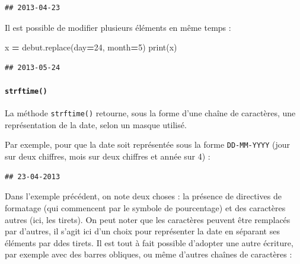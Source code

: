 \documentclass[12pt,]{book}
\newenvironment{Shaded}{\begin{snugshade}}{\end{snugshade}}
\newcommand{\DecValTok}[1]{\textcolor[rgb]{0.00,0.00,0.81}{#1}}
\newcommand{\SpecialCharTok}[1]{\textcolor[rgb]{0.00,0.00,0.00}{#1}}
\newcommand{\StringTok}[1]{\textcolor[rgb]{0.31,0.60,0.02}{#1}}
\newcommand{\OperatorTok}[1]{\textcolor[rgb]{0.81,0.36,0.00}{\textbf{#1}}}
\newcommand{\BuiltInTok}[1]{#1}
\newcommand{\NormalTok}[1]{#1}
\let\oldparagraph\paragraph
\renewcommand{\paragraph}[1]{\oldparagraph{#1}\mbox{}}
\numberwithin{equation}{section}
\numberwithin{countremarque}{section}
\begin{document}
\begin{lstlisting}
## 2013-04-23
\end{lstlisting}

Il est possible de modifier plusieurs éléments en même temps :

\begin{Shaded}
\begin{Highlighting}[]
\NormalTok{x }\OperatorTok{=}\NormalTok{ debut.replace(day}\OperatorTok{=}\DecValTok{24}\NormalTok{, month}\OperatorTok{=}\DecValTok{5}\NormalTok{)}
\BuiltInTok{print}\NormalTok{(x)}
\end{Highlighting}
\end{Shaded}

\begin{lstlisting}
## 2013-05-24
\end{lstlisting}

\paragraph{\texorpdfstring{\texttt{strftime()}}{strftime()}}\label{strftime}

La méthode \texttt{strftime()} retourne, sous la forme d'une chaîne de
caractères, une représentation de la date, selon un masque utilisé.

Par exemple, pour que la date soit représentée sous la forme
\texttt{DD-MM-YYYY} (jour sur deux chiffres, mois sur deux chiffres et
année sur 4) :

\begin{Shaded}
\end{Shaded}

\begin{lstlisting}
## 23-04-2013
\end{lstlisting}

Dans l'exemple précédent, on note deux choses : la présence de
directives de formatage (qui commencent par le symbole de pourcentage)
et des caractères autres (ici, les tirets). On peut noter que les
caractères peuvent être remplacés par d'autres, il s'agit ici d'un choix
pour représenter la date en séparant ses éléments par ddes tirets. Il
est tout à fait possible d'adopter une autre écriture, par exemple avec
des barres obliques, ou même d'autres chaînes de caractères :
\end{document}
